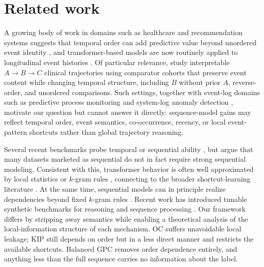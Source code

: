 \documentclass{article} %
\theoremstyle{plain}
\theoremstyle{definition}
\theoremstyle{remark}
\begin{document}
\section{Related work}
\label{sec:related_work}
A growing body of work in domains such as healthcare and recommendation systems suggests that temporal order can add predictive value beyond unordered event identity \citep{beaney2024coded_disease_representations,placido2023pancreatic_trajectories,pollington2026trajectory_review,kimLostSequenceLarge2025b}, and transformer-based models are now routinely applied to longitudinal event histories \citep{li2020behrt,rasmy2021medbert,savcisens2024using,delphi2025transformer}. Of particular relevance, \citet{edelman2026order_specific_ehr} study interpretable \(A\to B\to C\) clinical trajectories using comparator cohorts that preserve event content while changing temporal structure, including \(B\) without prior \(A\), reverse-order, and unordered comparisons. Such settings, together with event-log domains such as predictive process monitoring and system-log anomaly detection \citep{teinemaa2019outcome,du2017deeplog}, motivate our question but cannot answer it directly: sequence-model gains may reflect temporal order, event semantics, co-occurrence, recency, or local event-pattern shortcuts rather than global trajectory reasoning.

Several recent benchmarks probe temporal or sequential ability \citep{fatemiTESTTIMEBENCHMARK2025,cui2025timertemporalinstructionmodeling}, but \citet{klenitskiyDoesItLook2024} argue that many datasets marketed as sequential do not in fact require strong sequential modeling. Consistent with this, transformer behavior is often well approximated by local statistics or $k$-gram rules \citep{nguyen2024understanding,kimLostSequenceLarge2025b,bediFidelityMedicalReasoning2025}, connecting to the broader shortcut-learning literature \citep{mccoy2019right,geirhos2020shortcut,mirzadeh2024gsm}. At the same time, sequential models can in principle realize dependencies beyond fixed \(k\)-gram rules \citep{guMambaLinearTimeSequence2024}. Recent work has introduced tunable synthetic benchmarks for reasoning and sequence processing \citep{kaiserCogniLoadSyntheticNatural2025,ramezanaliSeqBenchTunableBenchmark2025}. Our framework differs by stripping away semantics while enabling a theoretical analysis of the local-information structure of each mechanism. OC suffers unavoidable local leakage; KIP still depends on order but in a less direct manner and restricts the available shortcuts. Balanced GPC removes order dependence entirely, and anything less than the full sequence carries no information about the label.
\end{document}
